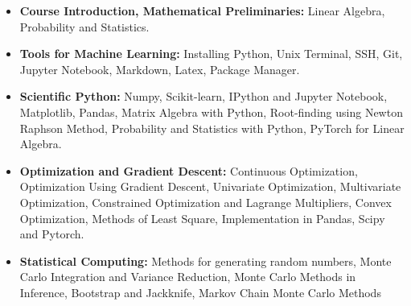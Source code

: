 \documentclass[11pt,oneside,openany]{book}
\newcommand{\topiclead}[1]{\textbf{\textcolor{deep}{#1}}}%
\begin{document}
\begin{itemize}
    \item \topiclead{Course Introduction, Mathematical Preliminaries:} Linear Algebra, Probability and Statistics.
    \item \topiclead{Tools for Machine Learning:} Installing Python, Unix Terminal, SSH, Git, Jupyter Notebook, Markdown, Latex, Package Manager.
    \item \topiclead{Scientific Python:} Numpy, Scikit-learn, IPython and Jupyter Notebook, Matplotlib, Pandas, Matrix Algebra with Python, Root-finding using Newton Raphson Method, Probability and Statistics with Python, PyTorch for Linear Algebra.
    \item \topiclead{Optimization and Gradient Descent:} Continuous Optimization, Optimization Using Gradient Descent, Univariate Optimization, Multivariate Optimization, Constrained Optimization and Lagrange Multipliers, Convex Optimization, Methods of Least Square, Implementation in Pandas, Scipy and Pytorch.
            \item \topiclead{Statistical Computing:} Methods for generating random numbers, Monte Carlo Integration and Variance Reduction, Monte Carlo Methods in Inference, Bootstrap and Jackknife, Markov Chain Monte Carlo Methods
            

\end{itemize}
\end{document}
